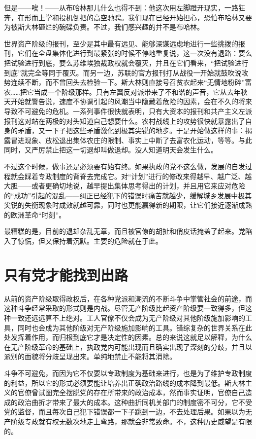 \documentclass[UTF8, 12pt, a4paper]{ctexrep}
\begin{document}
但是——唉！——从布哈林那儿什么也得不到：他这次用左脚蹬开现实，一路狂奔，在形而上学和投机倒把的高空驰骋。我们现在已经开始担心，恐怕布哈林又要为被斯大林砸烂的碗碟负责。不过，我们感兴趣的并不是布哈林。

世界资产阶级的报刊，至少是其中最有远见、能够深谋远虑地进行一些挑拨的报刊，它们在全盘集体化进行到最紧张的时候不停地重复说，这一次没有退路：要么把试验进行到底，要么苏维埃独裁政权就会覆灭，并且在它们看来，“把试验进行到底”就完全等同于覆灭。而另一边，苏联的官方报刊打从战役一开始就鼓吹说攻势连续不断，而不曾回头去检验一下。斯大林则直接号召贫农起来“无情地粉碎”富农……把它当成一个阶级那样。只有左翼反对派带来了不和谐的声音，它从去年秋天开始就警告说，速度不协调引起的风潮当中隐藏着危险的因素，会在不久的将来导致不可避免的危机。一系列事件很快就表明，只有大资本的报刊和共产主义左派报刊这对站在两极的对头知道自己想要什么。农村战线上的攻势很快就暴露出了自身的矛盾，又一下子把这些矛盾激化到极其尖锐的地步。于是开始做这样的事：揭露冒进现象、放松退出集体农庄的限制、事实上中断了去富农化运动，等等。与此同时，又严厉禁止把这一切退却叫做退却。没人知道明天会发生什么。

不过这个时候，做事还是必须要有始有终。如果执政的党不这么做，发展的自发过程就会踩着专政制度的背脊去完成它。对“计划”进行的修改来得越早、越广泛、越大胆——或者更确切地说，越早提出集体思考得出的计划，并且用它来应对危险的“成功”引起的混乱——纠正已经犯下的错误时痛苦就越少，缓解城乡发展中极其尖锐的失衡现象时成效就越可靠，同时也更能赢得新的期限，让它们接近逐渐成熟的欧洲革命“时刻”。

最糟糕的是，目前的退却杂乱无章，而且被官僚的胡扯和俏皮话掩盖了起来。党陷入了惊慌，但又保持着沉默。主要的危险就在于此。

\section{只有党才能找到出路}

从前的资产阶级取得政权后，在各种党派和潮流的不断斗争中掌管社会的前途，而这种斗争经常采取的形式则是内战。尽管无产阶级比起资产阶级要一致得多，但这种一致还远远算不上绝对。工人官僚不仅会成为无产阶级对其他阶级施加影响的工具，同时也会成为其他阶级对无产阶级施加影响的工具。错综复杂的世界关系在此处发挥着作用，而归根到底它才是决定性的因素。总的来说这就足以解释，为什么在无产阶级革命的基础上，执政党内可能出现而且确实出现了深刻的分歧，并且以派别的面貌将分歧呈现出来。单纯地禁止不能将其消除。

斗争不可避免，而因为它不仅要以专政制度为基础来进行，也是为了维护专政制度的利益，所以它的形式必须要能让培养出正确政治路线的成本降到最低。斯大林主义的官僚曾试图完全摆脱党的存在所带来的政治成本，然而事实证明，官僚自己造成的政治曲折才带来了最大的成本。这种曲折同机关部门的制度密不可分，它不受党的监督，而且每次自己犯下错误都一下子跳到一边，不去处理后果。如果以为无产阶级专政就有权无数次地走上弯路，那就会非常致命。不，这种历史威望是有限的。
\end{document}
